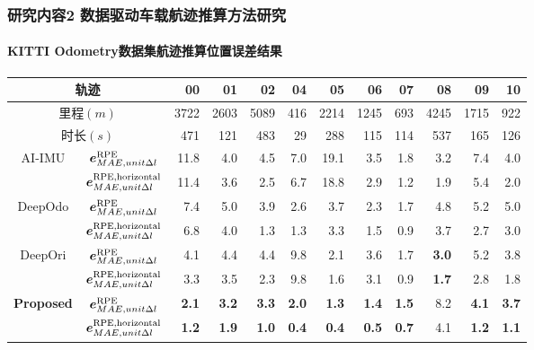 \begin{frame} 
 	\frametitle{研究内容2 数据驱动车载航迹推算方法研究}
 	\framesubtitle{KITTI Odometry数据集航迹推算位置误差结果}
    {\footnotesize
    \setlength{\tabcolsep}{2pt}
		\begin{tabular*}{\linewidth}{@{\extracolsep{\fill}}ccrrrrrrrrrr}
			\toprule
            \multicolumn{2}{c}{轨迹} & 00 & 01 & 02 & 04 & 05 & 06 & 07 & 08 & 09 & 10 \\
			\midrule
			\multicolumn{2}{c}{里程$\left(\unit{m}\right)$} & 3722 & 2603 & 5089 & 416 & 2214 & 1245 & 693 & 4245 & 1715 & 922 \\
			\multicolumn{2}{c}{时长$\left(\unit{s}\right)$} &  471 &  121 &  483 &  29 &  288 &  115 & 114 &  537 &  165 & 126 \\
			\multirow{2}{*}{AI-IMU}            & $\vb*{e}^{\mathrm{RPE}}_{MAE,unit \Delta l}$ & 11.8 & 4.0 & 4.5 & 7.0 & 19.1 & 3.5 & 1.8 & 3.2 & 7.4 & 4.0 \\
			                                   & $\vb*{e}^{\mathrm{RPE,horizontal}}_{MAE,unit \Delta l}$ & 11.4 & 3.6 & 2.5 & 6.7 & 18.8 & 2.9 & 1.2 & 1.9 & 5.4 & 2.0 \\
			\multirow{2}{*}{DeepOdo}           & $\vb*{e}^{\mathrm{RPE}}_{MAE,unit \Delta l}$ & 7.4 & 5.0 & 3.9 & 2.6 & 3.7 & 2.3 & 1.7 & 4.8 & 5.2 & 5.0 \\
			                                   & $\vb*{e}^{\mathrm{RPE,horizontal}}_{MAE,unit \Delta l}$ & 6.8 & 4.0 & 1.3 & 1.3 & 3.3 & 1.5 & 0.9 & 3.7 & 2.7 & 3.0 \\
			\multirow{2}{*}{DeepOri}           & $\vb*{e}^{\mathrm{RPE}}_{MAE,unit \Delta l}$ & 4.1 & 4.4 & 4.4 & 9.8 & 2.1 & 3.6 & 1.7 & \textbf{3.0} & 5.2 & 3.8 \\
			                                   & $\vb*{e}^{\mathrm{RPE,horizontal}}_{MAE,unit \Delta l}$ & 3.3 & 3.5 & 2.3 & 9.8 & 1.6 & 3.1 & 0.9 & \textbf{1.7} & 2.8 & 1.8 \\
			\multirow{2}{*}{\textbf{Proposed}} & $\vb*{e}^{\mathrm{RPE}}_{MAE,unit \Delta l}$ & \textbf{2.1} & \textbf{3.2} & \textbf{3.3} & \textbf{2.0} & \textbf{1.3} & \textbf{1.4} & \textbf{1.5} & 8.2 & \textbf{4.1} & \textbf{3.7} \\
			                                   & $\vb*{e}^{\mathrm{RPE,horizontal}}_{MAE,unit \Delta l}$ & \textbf{1.2} & \textbf{1.9} & \textbf{1.0} & \textbf{0.4} & \textbf{0.4} & \textbf{0.5} & \textbf{0.7} & 4.1 & \textbf{1.2} & \textbf{1.1} \\
			\bottomrule 
		\end{tabular*}
	}	
\end{frame}

